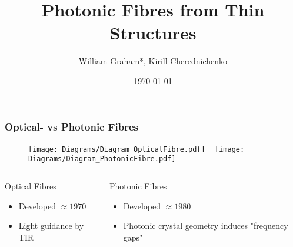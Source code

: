 \documentclass{beamer}
\title{Photonic Fibres from Thin Structures}
\author{William Graham*, Kirill Cherednichenko}
\institute{University of Bath}
\date{\today}
\begin{document}
 
\frame{\titlepage}
 

\begin{frame}
	\frametitle{Optical- vs Photonic Fibres}
	
	\begin{figure}[t]
		\centering
		\texttt{[image: Diagrams/Diagram\_OpticalFibre.pdf]}
		~
		\texttt{[image: Diagrams/Diagram\_PhotonicFibre.pdf]}
	\end{figure}
	\begin{columns}
		\begin{column}{0.45\textwidth}
			\begin{block}{Optical Fibres}
				\begin{itemize}
					\item Developed $\approx 1970$
					\item Light guidance by TIR
				\end{itemize}
			\end{block}
		\end{column}
		\begin{column}{0.45\textwidth}
			\begin{block}{Photonic Fibres}
				\begin{itemize}
					\item Developed $\approx 1980$
					\item Photonic crystal geometry induces "frequency gaps"
				\end{itemize}
			\end{block}
		\end{column}
	\end{columns}
\end{frame} 
\end{document}
